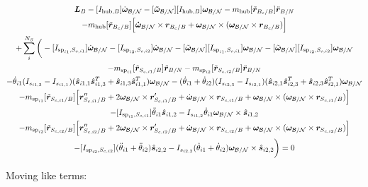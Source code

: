 \documentclass[paper]{aiaaNew}
\begin{document}
\begin{multline}
\bm L_B -[I_{\text{hub},B}] \dot{\bm\omega}_{\cal B/N}  -[\bm{\tilde{\omega}}_{\cal B/N}] [I_{\text{hub},B}] \bm\omega_{\cal B/N} - m_{\text{hub}} [\tilde{{\bm r}}_{B_c/B}] \ddot{\bm r}_{B/N} \\
- m_{\text{hub}} [\tilde{{\bm r}}_{B_c/B}] \Big[\bm{\dot{\omega}}_{\cal B/N} \times \bm{r}_{B_c/B} + \bm\omega_{\cal B/N} \times (\bm\omega_{\cal B/N} \times \bm{r}_{B_c/B})\Big]\\
+ \sum\limits_{i}^{N_S}\bigg(-[I_{\text{sp}_{i1},S_{c,i1}}] \dot{\bm \omega}_{\cal{B/N}} -[I_{\text{sp}_{i2},S_{c,i2}}] \dot{\bm \omega}_{\cal{B/N}} -[\tilde{\bm \omega}_{\cal{B/N}}] [I_{\text{sp}_{i1},S_{c,i1}}] \bm \omega_{\cal{B/N}}-[\tilde{\bm \omega}_{\cal{B/N}}] [I_{\text{sp}_{i2},S_{c,i2}}] \bm \omega_{\cal{B/N}}\\
- m_{\text{sp}_{i1}} [\tilde{{\bm r}}_{S_{c,i1}/B}] \ddot{\bm r}_{B/N}- m_{\text{sp}_{i2}} [\tilde{{\bm r}}_{S_{c,i2}/B}] \ddot{\bm r}_{B/N}\\
-\dot{\theta}_{i1} (I_{s_{i1,3}} - I_{s_{i1,1}})( \hat{\bm s}_{i1,1} \hat{\bm s}_{i1,3}^T + \hat{\bm s}_{i1,3} \hat{\bm s}_{i1,1}^T) \bm \omega_{\cal{B/N}} -(\dot{\theta}_{i1}  + \dot{\theta}_{i2})(I_{s_{i2,3}} - I_{s_{i2,1}}) (\hat{\bm s}_{i2,1} \hat{\bm s}_{i2,3}^T + \hat{\bm s}_{i2,3} \hat{\bm s}_{i2,1}^T) \bm \omega_{\cal{B/N}} \\
- m_{\text{sp}_{i1}} [\tilde{{\bm r}}_{S_{c,i1}/B}] \Big[\bm{r}''_{S_{c,i1}/B} + 2 \bm\omega_{\cal B/N} \times \bm{r}'_{S_{c,i1}/B} +  \dot{\bm\omega}_{\cal B/N} \times \bm{r}_{S_{c,i1}/B} + \bm\omega_{\cal B/N} \times (\bm\omega_{\cal B/N} \times \bm{r}_{S_{c,i1}/B})\Big]\\
-[I_{\text{sp}_{i1},S_{c,i1}}] \ddot{\theta}_{i1} \hat{\bm s}_{i1,2} 
-I_{s_{i1,2}} \dot{\theta}_{i1} \bm \omega_{\cal{B/N}} \times \hat{\bm s}_{i1,2}\\
- m_{\text{sp}_{i2}} [\tilde{{\bm r}}_{S_{c,i2}/B}] \Big[ \bm{r}''_{S_{c,i2}/B} + 2 \bm\omega_{\cal B/N} \times \bm{r}'_{S_{c,i2}/B} +  \dot{\bm\omega}_{\cal B/N} \times \bm{r}_{S_{c,i2}/B} + \bm\omega_{\cal B/N} \times (\bm\omega_{\cal B/N} \times \bm{r}_{S_{c,i2}/B})\Big]\\
-[I_{\text{sp}_{i2},S_{c,i2}}] (\ddot{\theta}_{i1}  + \ddot{\theta}_{i2})\hat{\bm s}_{i2,2} 
-I_{s_{i2,2}}  (\dot{\theta}_{i1}  + \dot{\theta}_{i2}) \bm \omega_{\cal{B/N}} \times \hat{\bm s}_{i2,2} \bigg) = 0
\end{multline}

Moving like terms:
\end{document}
